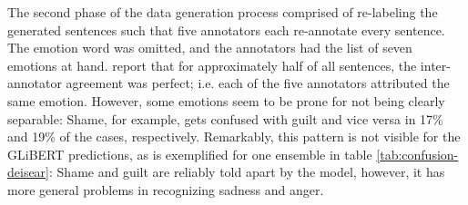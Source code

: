 The second phase of the data generation process comprised of re-labeling the generated sentences
such that five annotators each re-annotate every sentence. The emotion word was omitted, and
the annotators had the list of seven emotions at hand. \citeauthor{troiano2019crowdsourcing}
report that for approximately half of all sentences, the inter-annotator agreement was perfect;
i.e. each of the five annotators attributed the same emotion. However, some emotions seem to
be prone for not being clearly separable: Shame, for example, gets confused with guilt and vice versa
in 17\% and 19\% of the cases, respectively. Remarkably, this pattern is not visible for the GLiBERT
predictions, as is exemplified for one ensemble in table \ref{tab:confusion-deisear}: Shame and guilt
are reliably told apart by the model, however, it has more general problems in recognizing
sadness and anger.


